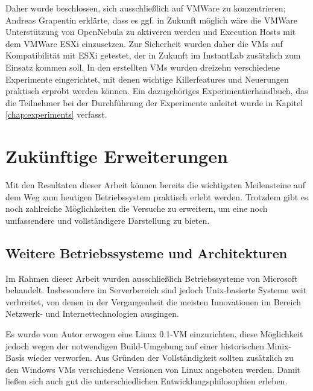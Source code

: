 	Daher wurde beschlossen, sich ausschließlich auf VMWare zu konzentrieren; 
	Andreas Grapentin erklärte, dass es ggf. in Zukunft möglich wäre die VMWare Unterstützung von OpenNebula zu aktiveren werden und Execution Hosts mit dem VMWare ESXi einzusetzen.
	Zur Sicherheit wurden daher die VMs auf Kompatibilität mit ESXi getestet, der in Zukunft im InstantLab zusätzlich zum Einsatz kommen soll.
	In den erstellten VMs wurden dreizehn verschiedene Experimente eingerichtet, mit denen wichtige Killerfeatures und Neuerungen praktisch erprobt werden können.
	Ein dazugehöriges Experimentierhandbuch, das die Teilnehmer bei der Durchführung der Experimente anleitet wurde in Kapitel \ref{chap:experiments} verfasst.


\section{Zukünftige Erweiterungen}
\label{sec:future}

	Mit den Resultaten dieser Arbeit können bereits die wichtigsten Meilensteine auf dem Weg zum heutigen Betriebssystem praktisch erlebt werden.
	Trotzdem gibt es noch zahlreiche Möglichkeiten die Versuche zu erweitern, um eine noch umfassendere und vollständigere Darstellung zu bieten. 


		\subsection{Weitere Betriebssysteme und Architekturen}
		
		Im Rahmen dieser Arbeit wurden ausschließlich Betriebssysteme von Microsoft behandelt.
		Insbesondere im Serverbereich sind jedoch Unix-basierte Systeme weit verbreitet, von denen in der Vergangenheit die meisten Innovationen im Bereich Netzwerk- und Internettechnologien ausgingen.

		Es wurde vom Autor erwogen eine Linux 0.1-VM einzurichten, diese Möglichkeit jedoch wegen der notwendigen Build-Umgebung auf einer historischen Minix-Basis wieder verworfen. 
		Aus Gründen der Vollständigkeit sollten zusätzlich zu den Windows VMs verschiedene Versionen von Linux angeboten werden. 
		Damit ließen sich auch gut die unterschiedlichen Entwicklungsphilosophien erleben.

